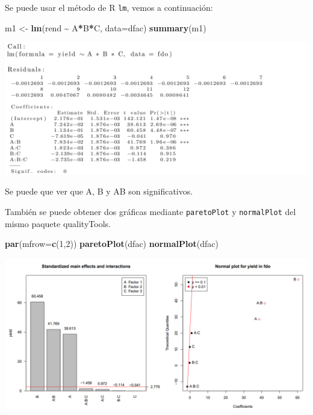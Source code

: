 \documentclass[
]{book}
\newenvironment{Shaded}{\begin{snugshade}}{\end{snugshade}}
\newcommand{\AttributeTok}[1]{\textcolor[rgb]{0.13,0.29,0.53}{#1}}
\newcommand{\DecValTok}[1]{\textcolor[rgb]{0.00,0.00,0.81}{#1}}
\newcommand{\FunctionTok}[1]{\textcolor[rgb]{0.13,0.29,0.53}{\textbf{#1}}}
\newcommand{\NormalTok}[1]{#1}
\newcommand{\OtherTok}[1]{\textcolor[rgb]{0.56,0.35,0.01}{#1}}
\newcommand{\SpecialCharTok}[1]{\textcolor[rgb]{0.81,0.36,0.00}{\textbf{#1}}}
\begin{document}
Se puede usar el método de R \texttt{lm}, vemos a continuación:

\begin{Shaded}
\begin{Highlighting}[]
\NormalTok{m1 }\OtherTok{\textless{}{-}} \FunctionTok{lm}\NormalTok{(rend }\SpecialCharTok{\textasciitilde{}}\NormalTok{ A}\SpecialCharTok{*}\NormalTok{B}\SpecialCharTok{*}\NormalTok{C, }\AttributeTok{data=}\NormalTok{dfac)}
\FunctionTok{summary}\NormalTok{(m1)}
\end{Highlighting}
\end{Shaded}

\includegraphics[width=6.25in,height=\textheight]{graficos/lmdfac.png}

Se puede que ver que A, B y AB son significativos.

También se puede obtener dos gráficas mediante \texttt{paretoPlot} y \texttt{normalPlot} del mismo paquete qualityTools.

\begin{Shaded}
\begin{Highlighting}[]
\FunctionTok{par}\NormalTok{(}\AttributeTok{mfrow=}\FunctionTok{c}\NormalTok{(}\DecValTok{1}\NormalTok{,}\DecValTok{2}\NormalTok{))}
\FunctionTok{paretoPlot}\NormalTok{(dfac)}
\FunctionTok{normalPlot}\NormalTok{(dfac)}
\end{Highlighting}
\end{Shaded}

\includegraphics[width=7.29167in,height=\textheight]{graficos/dfac2plots.png}
\end{document}
